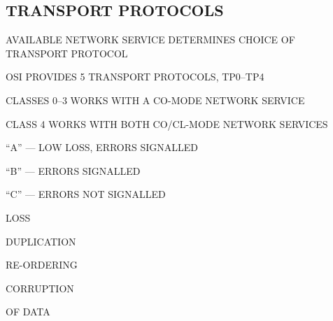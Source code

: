 \begin{bwslide}
\part*	{TRANSPORT PROTOCOLS}\bf

\begin{nrtc}
\item	AVAILABLE NETWORK SERVICE DETERMINES CHOICE OF TRANSPORT PROTOCOL

\item	OSI PROVIDES 5 TRANSPORT PROTOCOLS, TP0--TP4
    \begin{nrtc}
    \item	CLASSES 0--3 WORKS WITH A CO-MODE NETWORK SERVICE

    \item	CLASS 4 WORKS WITH BOTH CO/CL-MODE NETWORK SERVICES
    \end{nrtc}
\end{nrtc}
\end{bwslide}


\begin{bwslide}

\begin{nrtc}
\item	``A'' --- LOW LOSS, ERRORS SIGNALLED

\item	``B'' --- ERRORS SIGNALLED

\item	``C'' --- ERRORS NOT SIGNALLED
    \begin{nrtc}
    \item	LOSS

    \item	DUPLICATION

    \item	RE-ORDERING

    \item	CORRUPTION
    \end{nrtc}
    OF DATA
\end{nrtc}
\end{bwslide}


